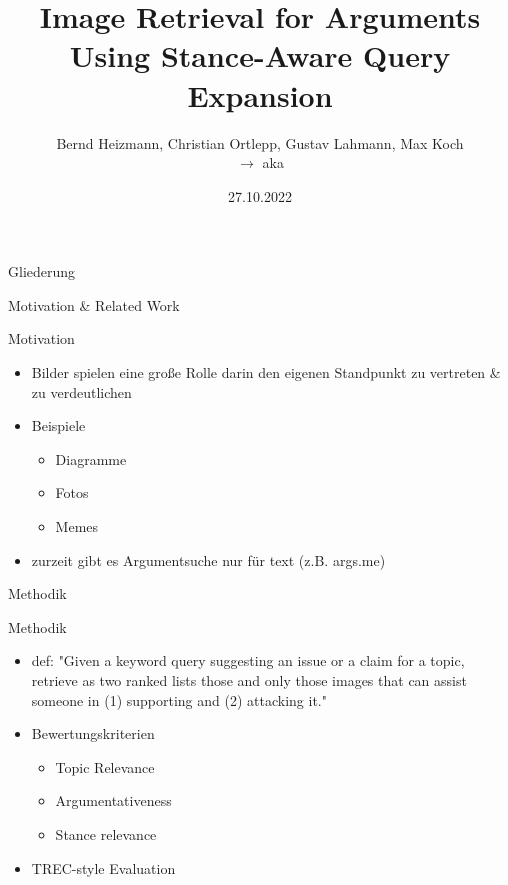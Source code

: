 \documentclass{beamer}
\title{Image Retrieval for Arguments Using Stance-Aware Query Expansion \texorpdfstring{\cite{kiesel:2021e}}{}}
\author{Bernd Heizmann, Christian Ortlepp, Gustav Lahmann, Max Koch\texorpdfstring{\\$\longrightarrow$ aka \teamname}{aka \teamname}}
\institute{Friedrich-Schiller-Universität Jena}
\date{27.10.2022}
\begin{document}
	
	
	\maketitle

	\begin{frame}{Gliederung}
		\tableofcontents
	\end{frame}
	
	\begin{section}{Motivation \& Related Work} %
		\begin{frame}{Motivation}
			\begin{itemize}
				\item Bilder spielen eine große Rolle darin den eigenen Standpunkt zu vertreten \& zu verdeutlichen
				\item Beispiele \begin{itemize}
					\item Diagramme
					\item Fotos
					\item Memes
				\end{itemize}
			\item zurzeit gibt es Argumentsuche nur für text (z.B. args.me)
			\end{itemize}
		\end{frame}
	\end{section}
	
	\begin{section}{Methodik}
		\begin{frame}{Methodik}
			\begin{itemize}
				\item def: "Given a keyword query suggesting an issue or a claim for a topic, retrieve as two ranked lists those and only those images that can assist someone in (1) supporting and (2) attacking it."
				\item Bewertungskriterien \begin{itemize}
					\item Topic Relevance
					\item Argumentativeness
					\item Stance relevance
				\end{itemize}
				\item TREC-style Evaluation
			\end{itemize}
		\end{frame}
	
	\end{section}
\end{document}
